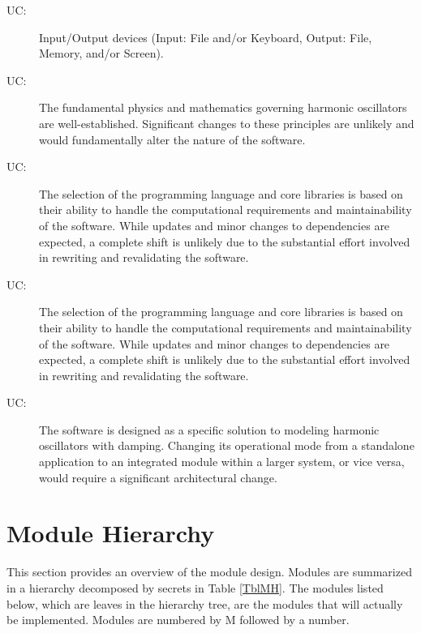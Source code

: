 \documentclass[12pt, titlepage]{article}
\newcounter{ucnum}
\newcommand{\uctheucnum}{UC\theucnum}
\begin{document}
\begin{description}
\item[ \uctheucnum \label{ucIODevices}:] Input/Output devices (Input: File and/or Keyboard, Output: File, Memory, and/or
Screen).
\item[ \uctheucnum \label{ucMathPrinciples}:] The fundamental physics and mathematics governing harmonic oscillators are well-established. Significant changes to these principles are unlikely and would fundamentally alter the nature of the software.
\item[ \uctheucnum \label{ucProgLanguage}:] The selection of the programming language and core libraries is based on their ability to handle the computational requirements and maintainability of the software. While updates and minor changes to dependencies are expected, a complete shift is unlikely due to the substantial effort involved in rewriting and revalidating the software.
\item[ \uctheucnum \label{ucProgLanguage}:] The selection of the programming language and core libraries is based on their ability to handle the computational requirements and maintainability of the software. While updates and minor changes to dependencies are expected, a complete shift is unlikely due to the substantial effort involved in rewriting and revalidating the software.
\item[ \uctheucnum \label{ucStandaloneApp}:] The software is designed as a specific solution to modeling harmonic oscillators with damping. Changing its operational mode from a standalone application to an integrated module within a larger system, or vice versa, would require a significant architectural change.
\end{description}

\section{Module Hierarchy} \label{SecMH}

This section provides an overview of the module design. Modules are summarized
in a hierarchy decomposed by secrets in Table \ref{TblMH}. The modules listed
below, which are leaves in the hierarchy tree, are the modules that will
actually be implemented. Modules are numbered
by M followed by a number.
\end{document}
